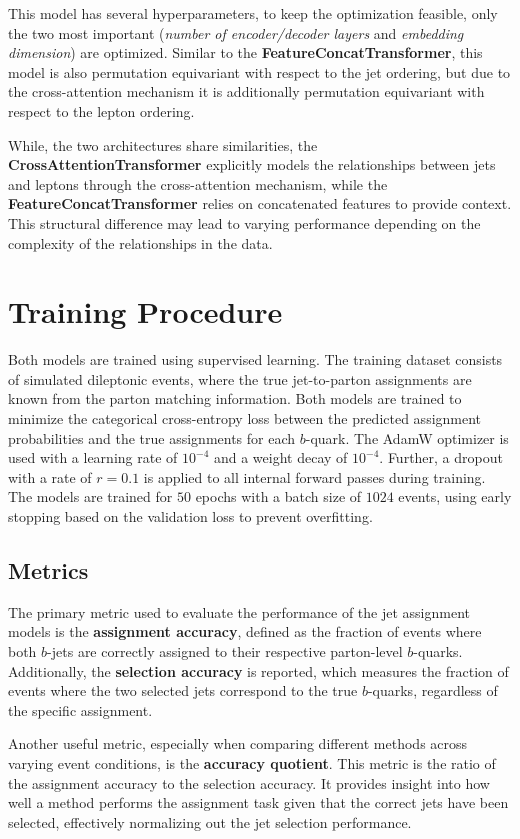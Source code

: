 This model has several hyperparameters, to keep the optimization feasible, only the two most important (\textit{number of encoder/decoder layers} and \textit{embedding dimension}) are optimized.
Similar to the \textbf{FeatureConcatTransformer}, this model is also permutation equivariant with respect to the jet ordering, but due to the cross-attention mechanism it is additionally permutation equivariant with respect to the lepton ordering.

While, the two architectures share similarities, the \textbf{CrossAttentionTransformer} explicitly models the relationships between jets and leptons through the cross-attention mechanism, while the \textbf{FeatureConcatTransformer} relies on concatenated features to provide context. This structural difference may lead to varying performance depending on the complexity of the relationships in the data.

\section{Training Procedure}
Both models are trained using supervised learning. The training dataset consists of simulated dileptonic \ttbar events, where the true jet-to-parton assignments are known from the parton matching information. Both models are trained to minimize the categorical cross-entropy loss between the predicted assignment probabilities and the true assignments for each $b$-quark. The AdamW \cite{adamW} optimizer is used with a learning rate of $10^{-4}$ and a weight decay of $10^{-4}$. Further, a dropout with a rate of $r=0.1$ is applied to all internal forward passes during training. The models are trained for $50$ epochs with a batch size of $1024$ events, using early stopping based on the validation loss to prevent overfitting.
\subsection{Metrics}
\label{sec:performance-metrics}
The primary metric used to evaluate the performance of the jet assignment models is the \textbf{assignment accuracy}, defined as the fraction of events where both $b$-jets are correctly assigned to their respective parton-level $b$-quarks. Additionally, the \textbf{selection accuracy} is reported, which measures the fraction of events where the two selected jets correspond to the true $b$-quarks, regardless of the specific assignment.

Another useful metric, especially when comparing different methods across varying event conditions, is the \textbf{accuracy quotient}. This metric is the ratio of the assignment accuracy to the selection accuracy. It provides insight into how well a method performs the assignment task given that the correct jets have been selected, effectively normalizing out the jet selection performance.



